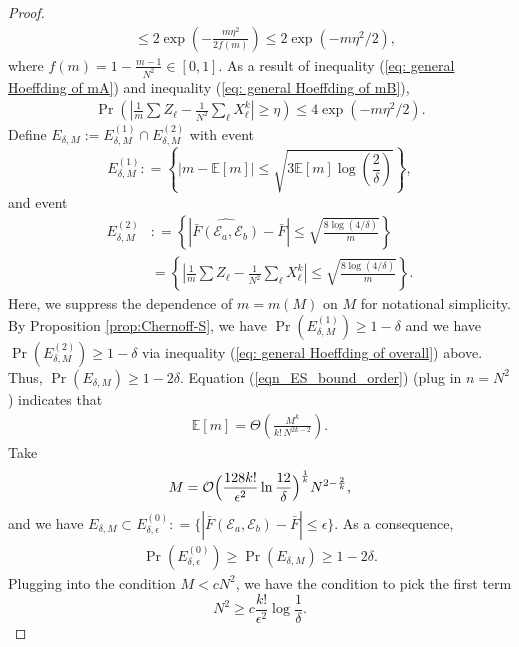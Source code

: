 \documentclass[aps,prx,reprint,superscriptaddress,amsmath,amssymb,longbibliography,floatfix]{revtex4-2}
\newcommand{\dsE}{\mathbb{E}}
\newcommand{\scE}{\mathcal{E}}
\theoremstyle{plain}
\theoremstyle{definition}
\theoremstyle{remark}
\begin{document}
\begin{proof}
\begin{equation}
\begin{aligned}
&\le 2 \exp(-\frac{m\eta^2}{2f(m)}) \leq 2\exp(-m\eta^2/2),
\end{aligned}
\end{equation}
    where $f(m) = 1-\frac{m-1}{N^2} \in [0,1]$. As a result of inequality (\ref{eq: general Hoeffding of mA}) and inequality (\ref{eq: general Hoeffding of mB}),
    \begin{align}\label{eq: general Hoeffding of overall}
        \Pr \left( |\frac{1}{m}\sum Z_\ell - \frac{1}{N^2} \sum_\ell X^k_\ell| \geq \eta \right) \leq 4\exp(-m\eta^2/2).
    \end{align}
    Define $E_{\delta, M} := E^{(1)}_{\delta, M} \cap E^{(2)}_{\delta, M} $ with event 
    $$E^{(1)}_{\delta, M} : = \left\{ |m - \dsE [m]| \leq  \sqrt{3 \dsE [m] \log(\frac{2}{\delta})}  \right\},$$
    and event 
    $$
\begin{aligned}
E^{(2)}_{\delta, M} &: = \left\{ |\widehat{\bar{F}(\scE_a,\scE_b)} - \bar{F} | \leq \sqrt{\frac{8\log(4/\delta)}{m}} \right\} \\
&= \left\{ |\frac{1}{m}\sum Z_\ell - \frac{1}{N^2} \sum_\ell X^k_\ell| \leq \sqrt{\frac{8\log(4/\delta)}{m}} \right\}.
\end{aligned}
$$ 
    Here, we suppress the dependence of $m=m(M)$ on $M$ for notational simplicity. By Proposition \ref{prop:Chernoff-S}, we have $\Pr(E^{(1)}_{\delta, M}) \geq 1 - \delta$ and we have $\Pr(E^{(2)}_{\delta, M}) \geq 1 - \delta$ via inequality (\ref{eq: general Hoeffding of overall}) above. Thus, 
    $\Pr(E_{\delta, M}) \geq 1 - 2\delta$. Equation (\ref{eqn_ES_bound_order}) (plug in $n=N^2$) indicates that 
    \begin{align*}
          \dsE [m] = \Theta \left( \frac{M^k}{k!\,N^{2k-2}} \right).
    \end{align*}
    Take
    \begin{equation}
        M = \mathcal{O} \Bigl( \frac{128k!}{\epsilon^2} \ln \frac{12}{\delta} \Bigr)^{\frac{1}{k}} N^{2-\frac{2}{k}}, \label{eq: M for k-MMD when lambda<<1}
    \end{equation}
    and we have $E_{\delta, M}\subset  E^{(0)}_{\delta,\epsilon} : = \{ |\widehat{\bar{F}(\scE_a,\scE_b)} - \bar{F} | \leq \epsilon \}$. As a consequence, %
    \begin{align*}
       \Pr(E^{(0)}_{\delta,\epsilon}) \geq \Pr(E_{\delta, M})\geq 1 - 2\delta.
    \end{align*}
    Plugging into the condition $M<cN^2$, we have the condition to pick the first term
    \begin{equation}
        N^2 \ge c\frac{k!}{\epsilon^2}\log\frac{1}{\delta}.
    \end{equation}


\end{proof}
\end{document}
